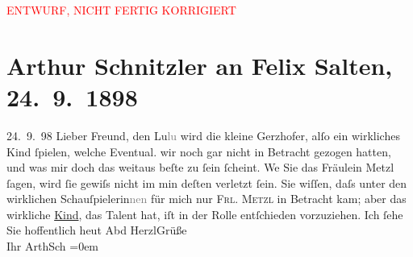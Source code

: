 
\begin{center}
            \textcolor{red}{ENTWURF, NICHT FERTIG KORRIGIERT}
                      \end{center}
            
         
         \renewcommand{\erwaehntePersonen}{Personen: Camilla Gerzhofer, Felix Salten, Ottilie Salten}
         \renewcommand{\erwaehnteOrte}{Orte: Wien}
         \renewcommand{\erwaehnteWerke}{Werke: Das Vermächtnis. Schauspiel in drei Akten}
               \section[Arthur Schnitzler an Felix Salten, 24. 9. 1898]{ Arthur Schnitzler an Felix Salten, 24. 9. 1898}\nopagebreak{}\rehead{ }\begin{ledgroupsized}[t]{13cm}\normalsize\beginnumbering \toendnotes[C]{\smallbreak\pagebreak[2]} 
\toendnotes[C]{\smallbreak}\pstart
           \raggedleft{}{\pb}24. 9. 98\pend
           \pstart{}Lieber Freund,\pend\pstart
           den Lu\textcolor{gray}{lu} wird die kleine Gerzhofer,
               alſo ein wirkliches Kind ſpielen, welche Eventual. wir noch gar nicht in Betracht
               gezogen hatten, und was mir {\pb}doch
               das weitaus beſte zu ſein ſcheint. We{\geminationn} Sie das Fräulein
               Metzl ſagen, wird ſie gewiſs nicht im min deſten
               verletzt ſein. Sie wiſſen, daſs unter den wirklichen
               Schauſpielerin\textcolor{gray}{nen} für mich nur \textsc{Frl. Metzl} in {\pb}Betracht kam; aber das
               wirkliche \uline{Kind}, das Talent hat, iſt in der Rolle
               entſchieden vorzuziehen. \pend
           \pstart
           Ich ſehe Sie hoffentlich heut Abd \pend
           \pstart
           HerzlGrüße {\\[\baselineskip]}Ihr \spacefill\mbox{ArthSch}\pend
           \leftskip=0em{}
         
         \endnumbering{}\end{ledgroupsized}\begin{anhang}\end{anhang}\newcommand{\dateiname}{L02966}\newcommand{\titel}{Arthur Schnitzler an Felix Salten, 24. 9. 1898}\newcommand{\editorInnen}{Martin Anton Müller und Laura Untner}
      